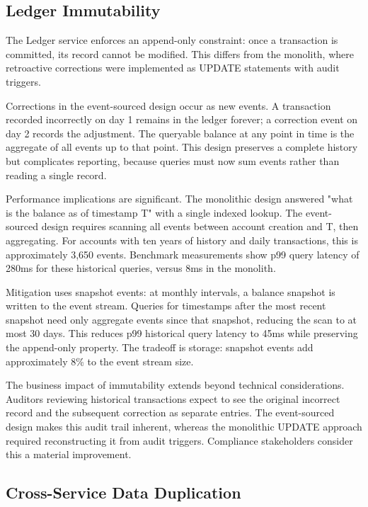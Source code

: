 \subsection{Ledger Immutability}

The Ledger service enforces an append-only constraint: once a transaction is committed, its record cannot be modified. This differs from the monolith, where retroactive corrections were implemented as UPDATE statements with audit triggers.

Corrections in the event-sourced design occur as new events. A transaction recorded incorrectly on day 1 remains in the ledger forever; a correction event on day 2 records the adjustment. The queryable balance at any point in time is the aggregate of all events up to that point. This design preserves a complete history but complicates reporting, because queries must now sum events rather than reading a single record.

Performance implications are significant. The monolithic design answered "what is the balance as of timestamp T" with a single indexed lookup. The event-sourced design requires scanning all events between account creation and T, then aggregating. For accounts with ten years of history and daily transactions, this is approximately 3,650 events. Benchmark measurements show p99 query latency of 280ms for these historical queries, versus 8ms in the monolith.

Mitigation uses snapshot events: at monthly intervals, a balance snapshot is written to the event stream. Queries for timestamps after the most recent snapshot need only aggregate events since that snapshot, reducing the scan to at most 30 days. This reduces p99 historical query latency to 45ms while preserving the append-only property. The tradeoff is storage: snapshot events add approximately 8\% to the event stream size.

The business impact of immutability extends beyond technical considerations. Auditors reviewing historical transactions expect to see the original incorrect record and the subsequent correction as separate entries. The event-sourced design makes this audit trail inherent, whereas the monolithic UPDATE approach required reconstructing it from audit triggers. Compliance stakeholders consider this a material improvement.

\subsection{Cross-Service Data Duplication}


